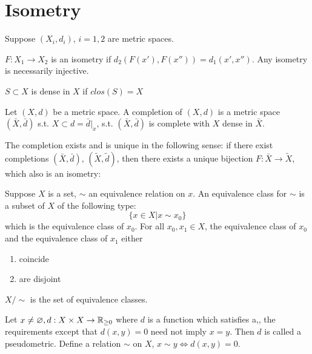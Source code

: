 \section{Isometry}
Suppose $(X_i,d_i)$, $i=1,2$ are metric spaces.
\begin{mydef}
$F: X_1 \to X_2$ is an isometry if $d_2(F(x'),F(x''))=d_1(x',x'')$. Any isometry is necessarily injective.
\end{mydef}
\begin{mydef}
$S\subset X$ is dense in $X$ if $clos(S)=X$
\end{mydef}
\begin{mydef}
Let $(X,d)$ be a metric space. A completion of $(X,d)$ is a metric space $(\bar{X},\bar{d})$ s.t. $X\subset d=\bar{d}|_x$, s.t. $(\bar{X},\bar{d})$ is complete with $X$ dense in $\bar{X}$.
\end{mydef}
\begin{thrm}
The completion exists and is unique in the following sense: if there exist completions $(\bar{X},\bar{d})$, $(\tilde{X},\tilde{d})$, then there exists a unique bijection $F: \bar{X}\to\tilde{X}$, which also is an isometry: \par
{}
Suppose $X$ is a set, $\sim$ an equivalence relation on $x$. An equivalence class for $\sim$ is a subset of $X$ of the following type:
\[ \{ x\in X|x\sim x_0\} \]
which is the equivalence class of $x_0$.
For all $x_0, x_1\in X$, the equivalence class of $x_0$ and the equivalence class of $x_1$ either
\begin{enumerate}
\item coincide
\item are disjoint
\end{enumerate}
\end{thrm}
$X/\sim$ is the set of equivalence classes. \par
Let $x\neq \varnothing, d: X\times X\to\mathbb{R}_{\geq 0}$ where $d$ is a function which satisfies a,, the requirements except that $d(x,y) = 0$ need not imply $x=y$. Then $d$ is called a pseudometric. Define a relation $\sim$ on $X$, $x\sim y \iff d(x,y)=0$.
